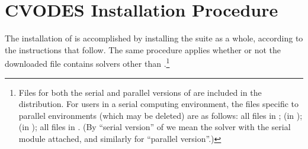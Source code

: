\chapter{CVODES Installation Procedure}\label{c:install}

The installation of {\cvodes} is accomplished by installing the
{\sundials} suite as a whole, according to the instructions that
follow.   The same procedure applies whether or not the downloaded
file contains solvers other than {\cvodes}.\footnote{Files for both the
serial and parallel versions of {\cvodes} are included in the distribution.
For users in a serial computing environment, the files specific to parallel
environments (which may be deleted) are as follows:
all files in ;
 (in );
 (in ); 
all files in .
(By ``serial version'' of {\cvodes} we mean the {\cvodes} solver with the
serial {\nvector} module attached, and similarly for ``parallel version''.)}

